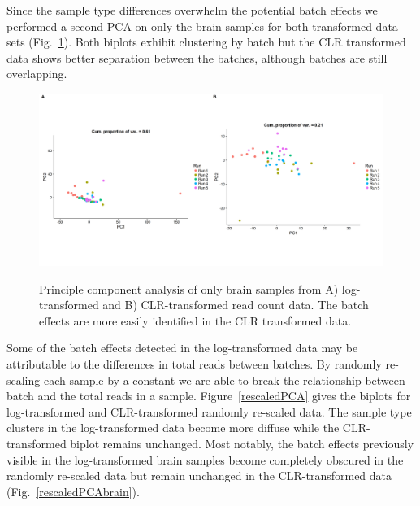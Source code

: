 \documentclass [10pt]{article}
\theoremstyle{definition}
\begin{document}
Since the sample type differences overwhelm the potential batch effects we performed a second PCA on only the brain samples for both transformed data sets (Fig.~\ref{rawPCAbrain}).  Both biplots exhibit clustering by batch but the CLR transformed data shows better separation between the batches, although batches are still overlapping.  

\begin{figure}
\includegraphics[scale=0.4]{./Figures/IO_PCA_Brain_logRaw_CLR}
\label{rawPCAbrain}
\caption{Principle component analysis of only brain samples from A) log-transformed and B) CLR-transformed read count data. The batch effects are more easily identified in the CLR transformed data.}
\end{figure}

Some of the batch effects detected in the log-transformed data may be attributable to the differences in total reads between batches.  By randomly re-scaling each sample by a constant we are able to break the relationship between batch and the total reads in a sample. Figure~\ref{rescaledPCA} gives the biplots for log-transformed and CLR-transformed randomly re-scaled data.  The sample type clusters in the log-transformed data become more diffuse while the CLR-transformed biplot remains unchanged.  Most notably, the batch effects previously visible in the log-transformed brain samples become completely obscured in the randomly re-scaled data but remain unchanged in the CLR-transformed data (Fig.~\ref{rescaledPCAbrain}).  
\end{document}
